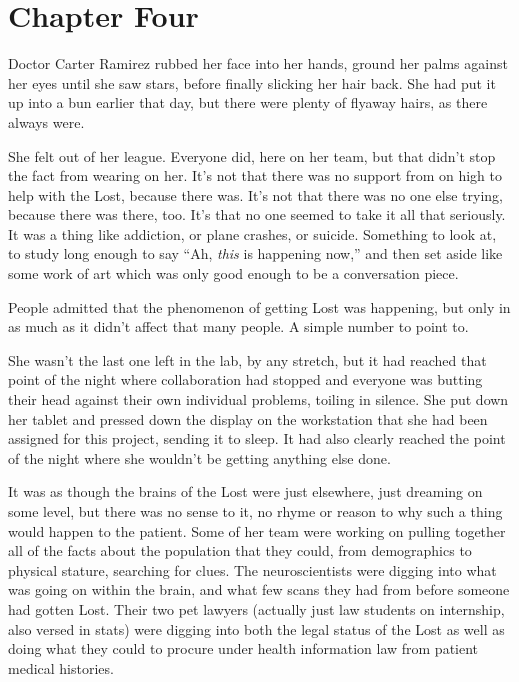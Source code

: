 \chapter*{Chapter Four}

Doctor Carter Ramirez rubbed her face into her hands, ground her palms against her eyes until she saw stars, before finally slicking her hair back. She had put it up into a bun earlier that day, but there were plenty of flyaway hairs, as there always were.

She felt out of her league. Everyone did, here on her team, but that didn't stop the fact from wearing on her. It's not that there was no support from on high to help with the Lost, because there was. It's not that there was no one else trying, because there was there, too. It's that no one seemed to take it all that seriously. It was a thing like addiction, or plane crashes, or suicide. Something to look at, to study long enough to say ``Ah, \textit{this} is happening now,'' and then set aside like some work of art which was only good enough to be a conversation piece.

People admitted that the phenomenon of getting Lost was happening, but only in as much as it didn't affect that many people. A simple number to point to.

She wasn't the last one left in the lab, by any stretch, but it had reached that point of the night where collaboration had stopped and everyone was butting their head against their own individual problems, toiling in silence. She put down her tablet and pressed down the display on the workstation that she had been assigned for this project, sending it to sleep. It had also clearly reached the point of the night where she wouldn't be getting anything else done.

It was as though the brains of the Lost were just elsewhere, just dreaming on some level, but there was no sense to it, no rhyme or reason to why such a thing would happen to the patient. Some of her team were working on pulling together all of the facts about the population that they could, from demographics to physical stature, searching for clues. The neuroscientists were digging into what was going on within the brain, and what few scans they had from before someone had gotten Lost. Their two pet lawyers (actually just law students on internship, also versed in stats) were digging into both the legal status of the Lost as well as doing what they could to procure under health information law from patient medical histories.


